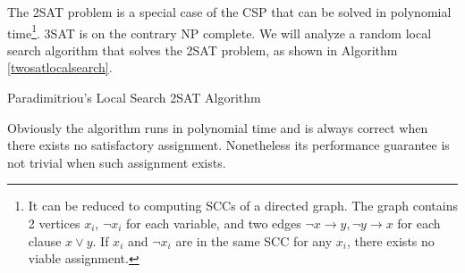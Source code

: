 The 2SAT problem is a special case of the CSP that can be solved in polynomial time\footnote{It can be reduced to computing SCCs of a directed graph. The graph contains 2 vertices $x_i$, $\neg x_i$ for each variable, and two edges $\neg x\rightarrow y,\neg y\rightarrow x$ for each clause $x\lor y$. If $x_i$ and $\neg x_i$ are in the same SCC for any $x_i$, there exists no viable assignment.}. 3SAT is on the contrary NP complete. We will analyze a random local search algorithm that solves the 2SAT problem, as shown in Algorithm \ref{twosatlocalsearch}.
\begin{algorithm}[ht]
\caption{Paradimitriou's Local Search 2SAT Algorithm}\label{twosatlocalsearch}
\begin{algorithmic}[1]
\Else{}
\EndIf\EndFor\EndFor
{}
\end{algorithmic}
\end{algorithm}
Obviously the algorithm runs in polynomial time and is always correct when there exists no satisfactory assignment. Nonetheless its performance guarantee is not trivial when such assignment exists.

